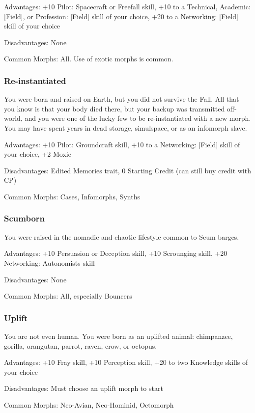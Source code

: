  Advantages: +10 Pilot: Spacecraft or Freefall skill,
 +10 to a Technical, Academic: [Field], or Profession:
 [Field] skill of your choice, +20 to a Networking:
 [Field] skill of your choice

 Disadvantages: None

 Common Morphs: All. Use of exotic morphs is
 common.

\subsubsection{Re-instantiated} %
 You were born and raised on Earth, but you did not
 survive the Fall. All that you know is that your body
 died there, but your backup was transmitted off-world,
 and you were one of the lucky few to be re-instantiated
 with a new morph. You may have spent years in dead
 storage, simulspace, or as an infomorph slave.
 
 Advantages: +10 Pilot: Groundcraft skill, +10 to a
 Networking: [Field] skill of your choice, +2 Moxie
 
 Disadvantages: Edited Memories trait, 0 Starting
 Credit (can still buy credit with CP)
 
 Common Morphs: Cases, Infomorphs, Synths

\subsubsection{Scumborn} %
 You were raised in the nomadic and chaotic lifestyle
 common to Scum barges.
 
 Advantages: +10 Persuasion or Deception skill, +10
 Scrounging skill, +20 Networking: Autonomists
 skill
 
 Disadvantages: None

 Common Morphs: All, especially Bouncers

\subsubsection{Uplift} %
 You are not even human. You were born as an uplifted
 animal: chimpanzee, gorilla, orangutan, parrot, raven,
 crow, or octopus.

 Advantages: +10 Fray skill, +10 Perception skill, +20
 to two Knowledge skills of your choice

 Disadvantages: Must choose an uplift morph to start

 Common Morphs: Neo-Avian, Neo-Hominid,
 Octomorph

